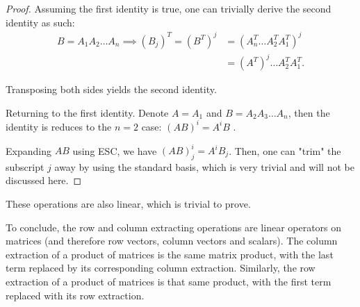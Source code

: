 \begin{proof}
  Assuming the first identity is true, one can trivially derive the second
  identity as such:
  \begin{align*}
    B = A_{1}A_{2}\ldots A_{n} \implies (B_{j})^{T} = (B^{T})^{j} &=
    (A_{n}^{T}\ldots A_{2}^{T}A_{1}^{T})^{j} \\
                                                                  &=
                                                                  (A^{T})^{j}\ldots
A_{2}^{T}A_{1}^{T}
  .\end{align*}

  Transposing both sides yields the second identity.

  Returning to the first identity. Denote \( A = A_{1} \) and \( B = A_{2}A_{3}
  \ldots A_{n} \),
  then the identity is reduces to the \( n = 2 \) case: \( (AB)^{i} = A^{i}B \)
  .

  Expanding \( AB \) using ESC, we have \( (AB)^{i}_{j} = A^{i}B_{j} \). Then,
  one can "trim" the subscript \( j \) away by using the standard basis, which
  is very trivial and will not be discussed here.
\end{proof}

These operations are also linear, which is trivial to prove.

To conclude, the row and column extracting operations are linear operators on
matrices (and therefore row vectors, column vectors and scalars). The
column extraction of a product of matrices is the same matrix product, with the
last term replaced by its corresponding column extraction. Similarly, the row
extraction of a product of matrices is that same product, with the first term
replaced with its row extraction.


